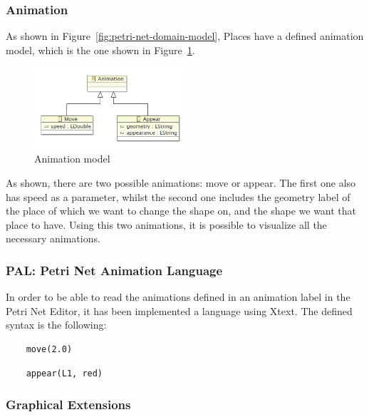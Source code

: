 \subsubsection{Animation}

As shown in Figure~\ref{fig:petri-net-domain-model}, Places have a defined animation model, which is the one shown in Figure~\ref{fig:animation-model}.

\begin{figure}[htp]
\begin{center}
  \includegraphics[width=0.5\textwidth]{image/animation_model.png}
  \caption{Animation model}
  \label{fig:animation-model}
\end{center}
\end{figure}

As shown, there are two possible animations: move or appear. The first one also has speed as a parameter, whilst the second one includes the geometry label of the place of which we want to change the shape on, and the shape we want that place to have. Using this two animations, it is possible to visualize all the necessary animations.

\subsubsection{PAL: Petri Net Animation Language}

In order to be able to read the animations defined in an animation label in the Petri Net Editor, it has been implemented a language using Xtext. The defined syntax is the following:

\begin{lstlisting}
	move(2.0)
\end{lstlisting}

\begin{lstlisting}
	appear(L1, red)
\end{lstlisting}

\subsubsection{Graphical Extensions}

